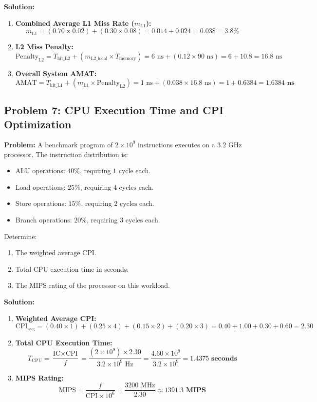 \textbf{Solution:}
\begin{enumerate}[label=\bfseries\arabic*.]
    \item \textbf{Combined Average L1 Miss Rate ($m_{\text{L1}}$):}
    \[ m_{\text{L1}} = (0.70 \times 0.02) + (0.30 \times 0.08) = 0.014 + 0.024 = 0.038 = 3.8\% \]
    \item \textbf{L2 Miss Penalty:}
    \[ \text{Penalty}_{\text{L2}} = T_{\text{hit\_L2}} + (m_{\text{L2\_local}} \times T_{\text{memory}}) = 6\text{ ns} + (0.12 \times 90\text{ ns}) = 6 + 10.8 = 16.8\text{ ns} \]
    \item \textbf{Overall System AMAT:}
    \[ \text{AMAT} = T_{\text{hit\_L1}} + (m_{\text{L1}} \times \text{Penalty}_{\text{L2}}) = 1\text{ ns} + (0.038 \times 16.8\text{ ns}) = 1 + 0.6384 = \mathbf{1.6384\text{ ns}} \]
\end{enumerate}

\subsection{Problem 7: CPU Execution Time and CPI Optimization}
\textbf{Problem:} A benchmark program of $2 \times 10^9$ instructions executes on a $3.2\text{ GHz}$ processor. The instruction distribution is:
\begin{itemize}
    \item ALU operations: $40\%$, requiring $1\text{ cycle}$ each.
    \item Load operations: $25\%$, requiring $4\text{ cycles}$ each.
    \item Store operations: $15\%$, requiring $2\text{ cycles}$ each.
    \item Branch operations: $20\%$, requiring $3\text{ cycles}$ each.
\end{itemize}
Determine:
\begin{enumerate}[label=\bfseries\alph*.]
    \item The weighted average CPI.
    \item Total CPU execution time in seconds.
    \item The MIPS rating of the processor on this workload.
\end{enumerate}

\textbf{Solution:}
\begin{enumerate}[label=\bfseries\alph*.]
    \item \textbf{Weighted Average CPI:}
    \[ \text{CPI}_{\text{avg}} = (0.40 \times 1) + (0.25 \times 4) + (0.15 \times 2) + (0.20 \times 3) = 0.40 + 1.00 + 0.30 + 0.60 = \mathbf{2.30} \]
    \item \textbf{Total CPU Execution Time:}
    \[ T_{\text{CPU}} = \frac{\text{IC} \times \text{CPI}}{f} = \frac{(2 \times 10^9) \times 2.30}{3.2 \times 10^9\text{ Hz}} = \frac{4.60 \times 10^9}{3.2 \times 10^9} = \mathbf{1.4375\text{ seconds}} \]
    \item \textbf{MIPS Rating:}
    \[ \text{MIPS} = \frac{f}{\text{CPI} \times 10^6} = \frac{3200\text{ MHz}}{2.30} \approx \mathbf{1391.3\text{ MIPS}} \]
\end{enumerate}

